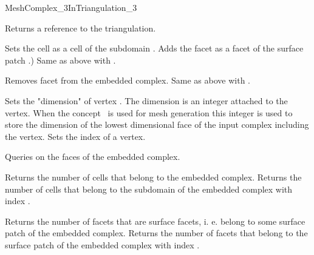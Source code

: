 \begin{ccRefConcept}{MeshComplex_3InTriangulation_3}
\begin{ccAdvanced}
{Returns a reference to the triangulation.}
\end{ccAdvanced}

\ccModifiers

{Sets  the cell  as a cell of  the subdomain  .}
\ccGlue
{}
{Adds  the facet  as a facet of the surface patch  .)}
\ccGlue
{}
{Same as above with .}

\ccGlue
{}
{Removes facet  from  the embedded complex.}
\ccGlue
{}
{Same as above with .}

{Sets the  "dimension"  of vertex .  The dimension is an integer attached to the vertex.
When the concept \ccRefName\ is used for mesh generation this integer is used to store
the dimension of the  lowest dimensional face of the input complex including the vertex.}
\ccGlue
{}
{Sets the index of a vertex.}


Queries on the  faces of the embedded complex.

{Returns the number of cells that belong to the embedded complex.}
\ccGlue
{}
{Returns the number of cells that belong to the subdomain of the embedded complex with index .}


{Returns the number of facets that are surface facets, i. e. belong to some surface patch
of  the embedded complex.}
\ccGlue
{}
{Returns the number of facets that belong to the surface patch
of  the embedded complex with index .}





\end{ccRefConcept}
